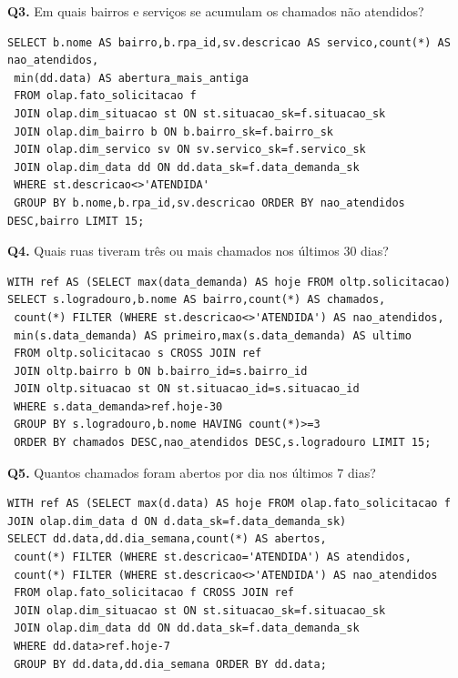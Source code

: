 \documentclass[12pt,a4paper]{article}
\begin{document}
\noindent\begin{minipage}{\textwidth}
\small\textbf{Q3.} Em quais bairros e serviços se acumulam os chamados não atendidos?\par\vspace{2pt}
\begin{lstlisting}
SELECT b.nome AS bairro,b.rpa_id,sv.descricao AS servico,count(*) AS nao_atendidos,
 min(dd.data) AS abertura_mais_antiga
 FROM olap.fato_solicitacao f
 JOIN olap.dim_situacao st ON st.situacao_sk=f.situacao_sk
 JOIN olap.dim_bairro b ON b.bairro_sk=f.bairro_sk
 JOIN olap.dim_servico sv ON sv.servico_sk=f.servico_sk
 JOIN olap.dim_data dd ON dd.data_sk=f.data_demanda_sk
 WHERE st.descricao<>'ATENDIDA'
 GROUP BY b.nome,b.rpa_id,sv.descricao ORDER BY nao_atendidos DESC,bairro LIMIT 15;
\end{lstlisting}
\end{minipage}\par\vspace{8pt}
\noindent\begin{minipage}{\textwidth}
\small\textbf{Q4.} Quais ruas tiveram três ou mais chamados nos últimos 30 dias?\par\vspace{2pt}
\begin{lstlisting}
WITH ref AS (SELECT max(data_demanda) AS hoje FROM oltp.solicitacao)
SELECT s.logradouro,b.nome AS bairro,count(*) AS chamados,
 count(*) FILTER (WHERE st.descricao<>'ATENDIDA') AS nao_atendidos,
 min(s.data_demanda) AS primeiro,max(s.data_demanda) AS ultimo
 FROM oltp.solicitacao s CROSS JOIN ref
 JOIN oltp.bairro b ON b.bairro_id=s.bairro_id
 JOIN oltp.situacao st ON st.situacao_id=s.situacao_id
 WHERE s.data_demanda>ref.hoje-30
 GROUP BY s.logradouro,b.nome HAVING count(*)>=3
 ORDER BY chamados DESC,nao_atendidos DESC,s.logradouro LIMIT 15;
\end{lstlisting}
\end{minipage}\par\vspace{8pt}
\noindent\begin{minipage}{\textwidth}
\small\textbf{Q5.} Quantos chamados foram abertos por dia nos últimos 7 dias?\par\vspace{2pt}
\begin{lstlisting}
WITH ref AS (SELECT max(d.data) AS hoje FROM olap.fato_solicitacao f JOIN olap.dim_data d ON d.data_sk=f.data_demanda_sk)
SELECT dd.data,dd.dia_semana,count(*) AS abertos,
 count(*) FILTER (WHERE st.descricao='ATENDIDA') AS atendidos,
 count(*) FILTER (WHERE st.descricao<>'ATENDIDA') AS nao_atendidos
 FROM olap.fato_solicitacao f CROSS JOIN ref
 JOIN olap.dim_situacao st ON st.situacao_sk=f.situacao_sk
 JOIN olap.dim_data dd ON dd.data_sk=f.data_demanda_sk
 WHERE dd.data>ref.hoje-7
 GROUP BY dd.data,dd.dia_semana ORDER BY dd.data;
\end{lstlisting}
\end{minipage}\par\vspace{8pt}
\end{document}
